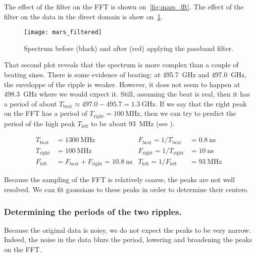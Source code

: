 The effect of the filter on the FFT is shown on~\cref{fig:mars_fft}.
The effect of the filter on the data in the direct domain is show on~\cref{fig:mars_filtered}.

\begin{figure}
    \centering
    \texttt{[image: mars\_filtered]}
    \caption{Spectrum before (black) and after (red) applying the passband filter.}
    \label{fig:mars_filtered}
\end{figure}

That second plot reveals that the spectrum is more complex than a couple of beating sines.
There is some evidence of beating: at \SI{495.7}{\giga\hertz} and \SI{497.0}{\giga\hertz}, the enveloppe of the ripple is weaker.
However, it does not seem to happen at \SI{498.3}{\giga\hertz} where we would expect it.
Still, assuming the beat is real, then it has a period of about
$T_\text{beat}\approx 497.0 - 495.7 = \SI{1.3}{\giga\hertz}$.
If we say that the right peak on the FFT has a period of
$T_\text{right}=\SI{100}{\mega\hertz}$,
then we can try to predict the period of the high peak
$T_\text{left}$ to be about \SI{93}{\mega\hertz} (see ).

\begin{align}
    T_\text{beat} &= \SI{1300}{\mega\hertz} &
    F_\text{beat} = 1/T_\text{beat}&= \SI{0.8}{\nano\second}
    \label{eq:thigh0}\\
    T_\text{right}  &= \SI{100}{\mega\hertz} &
    F_\text{right}  = 1/T_\text{right} &= \SI{10}{\nano\second}
    \label{eq:thigh1}\\
    F_\text{left} &= F_\text{beat} + F_\text{right} = \SI{10.8}{\nano\second} &
    T_\text{left} = 1/F_\text{left} &= \SI{93}{\mega\hertz}
    \label{eq:thigh2}
\end{align}

Because the sampling of the FFT is relatively coarse, the peaks are not well resolved.
We can fit gaussians to these peaks in order to determine their centers.

\subsubsection{Determining the periods of the two ripples.}
\label{sec:determining_the_periods_of_the_two_ripples}
Because the original data is noisy, we do not expect the peaks to be very narrow.
Indeed, the noise in the data blurs the period, lowering and broadening the peaks on the FFT.

